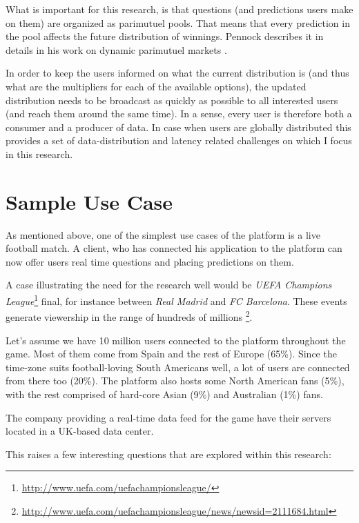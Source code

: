 \documentclass{uvamscse}
\begin{document}
What is important for this research, is that questions (and predictions users make on them) are organized as parimutuel pools. That means that every prediction in the pool affects the future distribution of winnings. Pennock describes it in details in his work on dynamic parimutuel markets \cite{Pari}.

In order to keep the users informed on what the current distribution is (and thus what are the multipliers for each of the available options), the updated distribution needs to be broadcast as quickly as possible to all interested users (and reach them around the same time). In a sense, every user is therefore both a consumer and a producer of data. In case when users are globally distributed this provides a set of data-distribution and latency related challenges on which I focus in this research.

\section{Sample Use Case}

As mentioned above, one of the simplest use cases of the platform is a live football match. A client, who has connected his application to the platform can now offer users real time questions and placing predictions on them.

A case illustrating the need for the research well would be \textit{UEFA Champions League}\footnote{\url{http://www.uefa.com/uefachampionsleague/}} final, for instance between \textit{Real Madrid} and \textit{FC Barcelona}. These events generate viewership in the range of hundreds of millions \footnote{\url{http://www.uefa.com/uefachampionsleague/news/newsid=2111684.html}}.

Let's assume we have 10 million users connected to the platform throughout the game. Most of them come from Spain and the rest of Europe (65\%). Since the time-zone suits football-loving South Americans well, a lot of users are connected from there too (20\%). The platform also hosts some North American fans (5\%), with the rest comprised of hard-core Asian (9\%) and Australian (1\%) fans.

The company providing a real-time data feed for the game have their servers located in a UK-based data center.

This raises a few interesting questions that are explored within this research:
\end{document}
